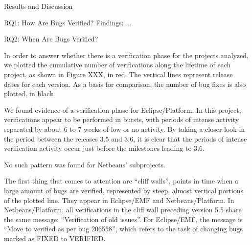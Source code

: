 \begin{section}{Results and Discussion}
\begin{subsection}{RQ1: How Are Bugs Verified?}
	Findings: ...
	
\end{subsection}

\begin{subsection}{RQ2: When Are Bugs Verified?}
	
	In order to answer whether there is a verification phase for the projects analyzed, we plotted the cumulative number of verifications along the lifetime of each project, as shown in Figure XXX, in red. The vertical lines represent release dates for each version. As a basis for comparison, the number of bug fixes is also plotted, in black. 

	We found evidence of a verification phase for Eclipse/Platform. In this project, verifications appear to be performed in bursts, with periods of intense activity separated by about 6 to 7 weeks of low or no activity. By taking a closer look in the period between the releases 3.5 and 3.6, it is clear that the periods of intense verification activity occur just before the milestones leading to 3.6.
	
	No such pattern was found for Netbeans' subprojects.
	
	
	
	
	The first thing that comes to attention are ``cliff walls'', points in time when a large amount of bugs are verified, represented by steep, almost vertical portions of the plotted line. They appear in Eclipse/EMF and Netbeans/Platform. In Netbeans/Platform, all verifications in the cliff wall preceding version 5.5 share the same message: ``Verification of old issues''. For Eclipse/EMF, the message is ``Move to verified as per bug 206558'', which refers to the task of changing bugs marked as FIXED to VERIFIED.
	

\end{subsection}
\end{section}
